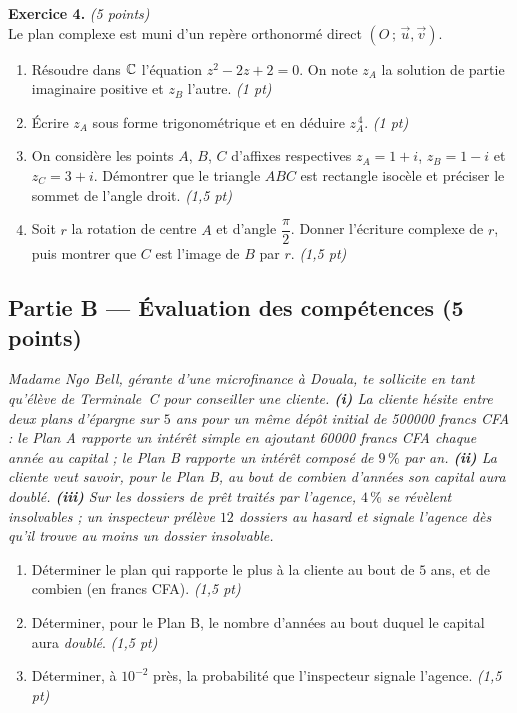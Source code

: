 \smallskip
\noindent\textbf{Exercice 4.} \hfill\textit{(5 points)}\\
Le plan complexe est muni d'un repère orthonormé direct $(O\,;\,\vec u,\vec v)$.
\begin{enumerate}[label=\arabic*)]
\item Résoudre dans $\mathbb{C}$ l'équation $z^2-2z+2=0$. On note $z_A$ la solution de partie
imaginaire positive et $z_B$ l'autre. \hfill\textit{(1 pt)}
\item Écrire $z_A$ sous forme trigonométrique et en déduire $z_A^{\,4}$. \hfill\textit{(1 pt)}
\item On considère les points $A$, $B$, $C$ d'affixes respectives $z_A=1+i$, $z_B=1-i$
et $z_C=3+i$. Démontrer que le triangle $ABC$ est rectangle isocèle et préciser le sommet
de l'angle droit. \hfill\textit{(1,5 pt)}
\item Soit $r$ la rotation de centre $A$ et d'angle $\dfrac{\pi}{2}$. Donner l'écriture
complexe de $r$, puis montrer que $C$ est l'image de $B$ par $r$. \hfill\textit{(1,5 pt)}
\end{enumerate}

\subsection*{Partie B — Évaluation des compétences \hfill (5 points)}

\noindent\textit{Madame Ngo Bell, gérante d'une microfinance à Douala, te sollicite en
tant qu'élève de Terminale~C pour conseiller une cliente. \textbf{(i)} La cliente hésite
entre deux plans d'épargne sur $5$ ans pour un même dépôt initial de \num{500000} francs
CFA : le \emph{Plan A} rapporte un intérêt simple en ajoutant \num{60000} francs CFA
chaque année au capital ; le \emph{Plan B} rapporte un intérêt composé de $9\,\%$ par an.
\textbf{(ii)} La cliente veut savoir, pour le Plan B, au bout de combien d'années son
capital aura \emph{doublé}. \textbf{(iii)} Sur les dossiers de prêt traités par l'agence,
$4\,\%$ se révèlent insolvables ; un inspecteur prélève $12$ dossiers au hasard et signale
l'agence dès qu'il trouve au moins un dossier insolvable.}

\begin{enumerate}[label=\textbf{Tâche \arabic*.},leftmargin=2.4em]
\item Déterminer le plan qui rapporte le plus à la cliente au bout de $5$ ans, et de
combien (en francs CFA). \hfill\textit{(1,5 pt)}
\item Déterminer, pour le Plan B, le nombre d'années au bout duquel le capital aura
\emph{doublé}. \hfill\textit{(1,5 pt)}
\item Déterminer, à $10^{-2}$ près, la probabilité que l'inspecteur signale l'agence. \hfill\textit{(1,5 pt)}
\end{enumerate}
\par{}

